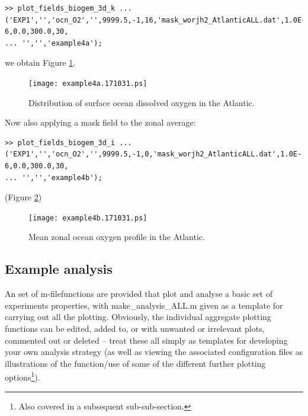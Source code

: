 \documentclass[11pt,fleqn]{book} %
\begin{document}
\begin{enumerate}[noitemsep]
\footnotesize
\vspace{-0pt}\begin{verbatim}
>> plot_fields_biogem_3d_k ...
('EXP1','','ocn_O2','',9999.5,-1,16,'mask_worjh2_AtlanticALL.dat',1.0E-6,0.0,300.0,30, 
... '','','example4a');
\end{verbatim}\vspace{-0pt}
\normalsize
we obtain Figure \ref{fig:example4a}.
 
\begin{figure}[ht]
\begin{center}
\texttt{[image: example4a.171031.ps]}
\end{center}
\vspace{-11mm}
\caption{Distribution of surface ocean dissolved  oxygen in the Atlantic.}
\label{fig:example4a}
\end{figure}

Now also applying a mask field to the zonal average:

\footnotesize
\vspace{-0pt}\begin{verbatim}
>> plot_fields_biogem_3d_i ...
('EXP1','','ocn_O2','',9999.5,-1,0,'mask_worjh2_AtlanticALL.dat',1.0E-6,0.0,300.0,30, 
... '','','example4b');
\end{verbatim}\vspace{-0pt}
\normalsize
(Figure \ref{fig:example4b})

\begin{figure}[ht]
\begin{center}
\texttt{[image: example4b.171031.ps]}
\end{center}
\vspace{-11mm}
\caption{Mean zonal ocean oxygen profile in the Atlantic.}
\label{fig:example4b}
\end{figure}

\end{enumerate}


\subsection{Example analysis}

An set of \footnotesize\textsf{m-file}\normalsize functions are provided that plot and analyse a basic set of experiments properties, with \footnotesize\textsf{make\_analysis\_ALL.m}\normalsize
given as a template for carrying out all the plotting. Obviously, the individual aggregate plotting functions can be edited, added to, or with unwanted or irrelevant plots, commented out or deleted -- treat these all simply as templates for developing your own analysis strategy (as well as viewing the associated configuration files as illustrations of the function/use of some of the different further plotting options\footnote{Also covered in a subsequent sub-sub-section.}).
\end{document}
